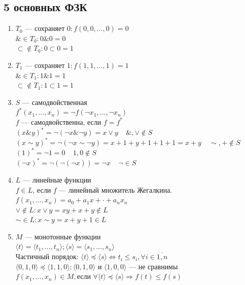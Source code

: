 \documentclass{article}
\begin{document}
\subsection{5 основных ФЗК}
\begin{enumerate}
    \item $T_0$ --- сохраняет $0: f(0, 0, \dots, 0) = 0$ \\
    $\& \in T_0: 0 \& 0 = 0$ \\
    $\subset \notin T_0: 0 \subset 0 = 1$
    \item $T_1$ --- сохраняет $1: f(1, 1, \dots, 1) = 1$ \\
    $\& \in T_1: 1 \& 1 = 1$ \\
    $\subset \notin T_1: 1 \subset 1 = 1$
    \item $S$ --- самодвойственная \\
    $f^*(x_1, \dots, x_n) = \neg f(\neg x_1, \dots, \neg x_n)$ \\
    $f$ --- самодвойственна, если $f = f^*$ \\
    $(x \& y)^* = \neg(\neg x \& \neg y) = x \vee y                          ~~~~~ \&,   \vee \notin S$ \\
    $(x \sim y)^* = \neg(\neg x \sim \neg y) = x + 1 + y + 1 + 1 + 1 = x + y ~~~~~ \sim, +    \notin S$ \\
    $(1)^* = \neg 1 = 0                                                      ~~~~~ 1,    0    \notin S$ \\
    $(\neg x)^* = \neg(\neg(\neg x)) = \neg x                                ~~~~~ \neg       \in    S$ \\
    \item $L$ --- линейные функции \\
    $f \in L$, если $f$ --- линейный множитель Жегалкина. \\
    $f(x_1, \dots, x_n) = a_0 + a_1 x + \cdot + a_n x_n$ \\
    $\vee \notin L: x \vee y = xy + x + y \notin L$ \\
    $\sim \in    L: x \sim y = x + y + 1  \in    L$ \\
    \item $M$ --- монотонные функции \\
    $\langle t \rangle = \langle t_1, \dots, t_n \rangle; \langle s \rangle = \langle s_1, \dots, s_n \rangle$ \\
    $\text{Частичный порядок: } \langle t \rangle \preccurlyeq \langle s \rangle \Leftrightarrow t_i \le s_i, \forall i \in \overline{1, n}$ \\
    $\langle 0, 1, 0 \rangle \preccurlyeq \langle 1, 1, 0 \rangle: \langle 0, 1, 0 \rangle \text{ и } \langle 1, 0, 0 \rangle \text{ --- не сравнимы}$ \\
    $ f(x_1, \dots, x_n) \in M, \text{если } \forall \langle t \rangle \preccurlyeq \langle s \rangle \Rightarrow f(t) \le f(s)$
\end{enumerate}
\end{document}
